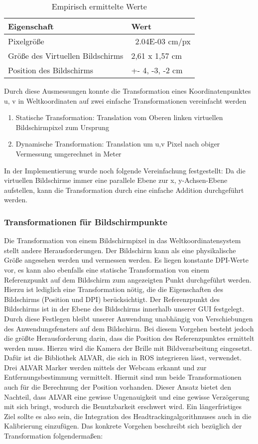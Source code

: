  \begin{table}[h]
 \begin{tabular}{l|l}
  Eigenschaft & Wert \\
  \hline
  \hline
  Pixelgröße & ~2.04E-03 cm/px \\
  Größe des Virtuellen Bildschirms & 2,61 x 1,57 cm \\
  Position des Bildschirms & +- 4, -3, -2 cm \\
 \end{tabular}
 \label{tab:konstanteWerte}
 \caption{Empirisch ermittelte Werte}
 \end{table}
Durch diese Ausmessungen konnte die  Transformation eines Koordinatenpunktes u, v in Weltkoordinaten auf zwei einfache Transformationen vereinfacht werden

   \begin{enumerate}
      \item Statische Transformation: Translation vom Oberen linken virtuellen Bildschirmpixel zum Ursprung
      \item Dynamische Transformation: Translation um u,v Pixel nach obiger Vermessung umgerechnet in Meter
   \end{enumerate}


In der Implementierung wurde noch folgende Vereinfachung festgestellt: Da die virtuellen Bildschirme immer eine parallele Ebene zur x, y-Achsen-Ebene aufstellen, kann die Transformation durch eine einfache Addition durchgeführt werden.

\subsubsection*{Transformationen für Bildschirmpunkte}
\label{ssection:alva}
Die Transformation von einem Bildschirmpixel in das Weltkoordinatensystem stellt andere Herausforderungen. 
Der Bildschirm kann als eine physikalische Größe angesehen werden und vermessen werden. 
Es liegen konstante  \ac{DPI}-Werte vor, es kann also ebenfalls eine statische Transformation von einem Referenzpunkt auf dem Bildschirm zum angezeigten Punkt durchgeführt werden. 
Hierzu ist lediglich eine Transformation nötig, die die Eigenschaften des Bildschirms (Position und DPI) berücksichtigt. 
Der Referenzpunkt des Bildschirms ist in der Ebene des Bildschirms innerhalb unserer GUI festgelegt. Durch diese Festlegen bleibt unserer Anwendung unabhängig von Verschiebungen des Anwendungsfensters auf dem Bildschirm. 
Bei diesem Vorgehen besteht jedoch die größte Herausforderung darin, dass die Position des Referenzpunktes ermittelt werden muss. 
Hierzu wird die Kamera der Brille mit Bildverarbeitung eingesetzt. 
Dafür ist die Bibliothek ALVAR, die sich in ROS integrieren lässt, verwendet.
Drei ALVAR Marker werden mittels der Webcam erkannt und zur Entfernungsbestimmung vermittelt. 
Hiermit sind nun beide Transformationen auch für die Berechnung der Position vorhanden. 
Dieser Ansatz bietet den Nachteil, dass ALVAR eine gewisse Ungenauigkeit und eine gewisse Verzögerung mit sich bringt, wodurch die Benutzbarkeit erschwert wird. 
Ein längerfristiges Ziel sollte es also sein, die Integration des Headtrackingalgorithmuses auch in die Kalibrierung einzufügen.
Das konkrete Vorgehen beschreibt sich bezüglich der Transformation folgendermaßen:

